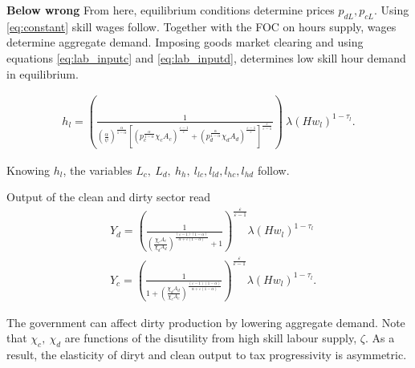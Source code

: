 \textbf{Below wrong}
From here,  equilibrium conditions determine prices $p_{dL}, p_{cL}$. Using \ref{eq:constant} skill wages follow. Together with the FOC on hours supply, wages determine aggregate demand. Imposing goods market clearing and using equations \ref{eq:lab_inputc} and \ref{eq:lab_inputd}, determines low skill hour demand in equilibrium.

\begin{align*}
h_l=\left( \frac{1}{\left(\frac{\alpha}{\psi}\right)^{\frac{\alpha}{1-\alpha}}\left[\left(p_c^\frac{\alpha}{1-\alpha}\chi_c A_c\right)^\frac{\varepsilon-1}{\varepsilon}+\left(p_d^\frac{\alpha}{1-\alpha}\chi_d A_d\right)^\frac{\varepsilon-1}{\varepsilon}\right]^\frac{\varepsilon}{\varepsilon-1}}\right)\ \lambda \left(H w_l\right)^{1-\tau_l}.
\end{align*}

Knowing $h_l$, the variables $L_c, \ L_d, \ h_h, \ l_{lc}, l_{ld}, l_{hc}, l_{hd}$ follow. 

Output of the clean and dirty sector read
\begin{align}
&Y_d = \left(\frac{1}{\left(\frac{\chi_c A_c}{\chi_d A_d}\right)^{\frac{(\varepsilon-1)(1-\alpha)}{\alpha+\varepsilon(1-\alpha)}}+1}\right)^\frac{\varepsilon}{\varepsilon-1}\lambda (H w_l)^{1-\tau_l}\\
& Y_c= \left(\frac{1}{1+\left(\frac{\chi_d A_d}{\chi_c A_c}\right)^{\frac{(\varepsilon-1)(1-\alpha)}{\alpha+\varepsilon(1-\alpha)}}}\right)^\frac{\varepsilon}{\varepsilon-1}\lambda (H w_l)^{1-\tau_l}.
\end{align}

The government can affect dirty production by lowering aggregate demand. Note that $\chi_c,\ \chi_d$ are functions of the disutility from high skill labour supply, $\zeta$. As a result, the elasticity of diryt and clean output to tax progressivity is asymmetric.
